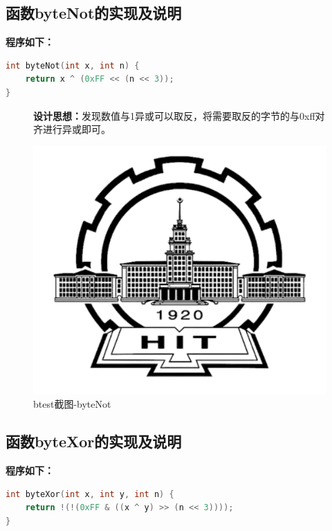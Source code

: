 \subsection{函数byteNot的实现及说明}

\textbf{程序如下：}
\begin{lstlisting}[language = c]
int byteNot(int x, int n) {
	return x ^ (0xFF << (n << 3));
}
\end{lstlisting}

\begin{figure}[H]
\begin{minipage}[c]{0.5\linewidth}
\textbf{设计思想：}发现数值与1异或可以取反，将需要取反的字节的与0xff对齐进行异或即可。	
\end{minipage}
\begin{minipage}[c]{0.4\linewidth}
\centering
\includegraphics[width=0.9\linewidth]{figures/HIT}
\caption{btest截图-byteNot}
\label{fig:byteNote}
\end{minipage}
\end{figure}

\subsection{函数byteXor的实现及说明}

\textbf{程序如下：}
\begin{lstlisting}[language = c]
int byteXor(int x, int y, int n) {
	return !(!(0xFF & ((x ^ y) >> (n << 3))));
}
\end{lstlisting}

